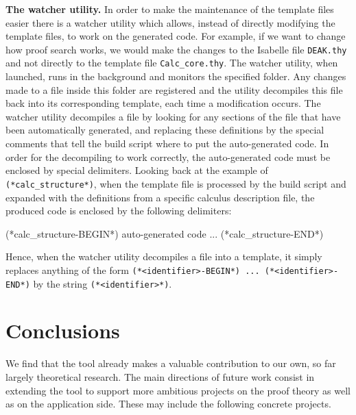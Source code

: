 \documentclass[runningheads,a4paper]{llncs}
\begin{document}
\medskip\noindent\textbf{The watcher utility. } In order to make the maintenance of the template files easier there is a watcher utility which allows, instead of directly modifying the template files, to work on the generated code. For example, if we want to change how proof search works, we would make the changes to the Isabelle file \texttt{DEAK.thy} and not directly to the template file \texttt{Calc\_core.thy}. The watcher utility, when launched, runs in the background and monitors the specified folder. Any changes made to a file inside this folder are registered and the utility decompiles this file back into its corresponding template, each time a modification occurs. The watcher utility decompiles a file by looking for any sections of the file that have been automatically generated, and replacing these definitions by the special comments that tell the build script where to put the auto-generated code. In order for the decompiling to work correctly, the auto-generated code must be enclosed by special delimiters. Looking back at the example of \texttt{(*calc\_structure*)}, when the template file is processed by the build script and expanded with the definitions from a specific calculus description file, the produced code is enclosed by the following delimiters:

\begin{pyglist}[language = isabelle]
(*calc_structure-BEGIN*)
auto-generated code ...
(*calc_structure-END*)
\end{pyglist}

\noindent
Hence, when the watcher utility decompiles a file into a template, it simply replaces anything of the form \texttt{(*<identifier>-BEGIN*) ... (*<identifier>-END*)} by the string \texttt{(*<identifier>*)}.


\section{Conclusions}\label{sec:conclusion}
We find that the tool already makes a valuable contribution to our own, so far largely theoretical research. The main directions of future work consist in extending the tool to support more ambitious projects on the proof theory as well as on the application side. These may include the following concrete projects.
\end{document}
